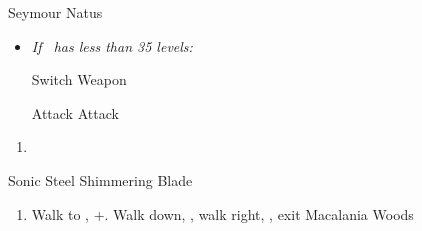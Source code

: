 \begin{battle}[36000]{Seymour Natus}
  \begin{itemize}
    \item \textit{If \lulu\ has less than 35 levels:}
          \begin{itemize}
            \switch{\tidus}{\lulu}
            \luluf Switch Weapon
            \switch{\lulu}{\tidus}
          \end{itemize}
          \tidusf Attack
          \summon{\bahamut}
          \bahamutf Attack
  \end{itemize}
\end{battle}
\begin{enumerate}[resume]
  \item \sd
\end{enumerate}
\begin{equip}
  \begin{itemize}
    \tidusf Sonic Steel
    \auronf Shimmering Blade
  \end{itemize}
\end{equip}
\begin{enumerate}[resume]
  \item Walk to \yuna, \cs+\skippablefmv[10:10]. Walk down, \cs[1:40], walk right, \save, exit Macalania Woods
\end{enumerate}